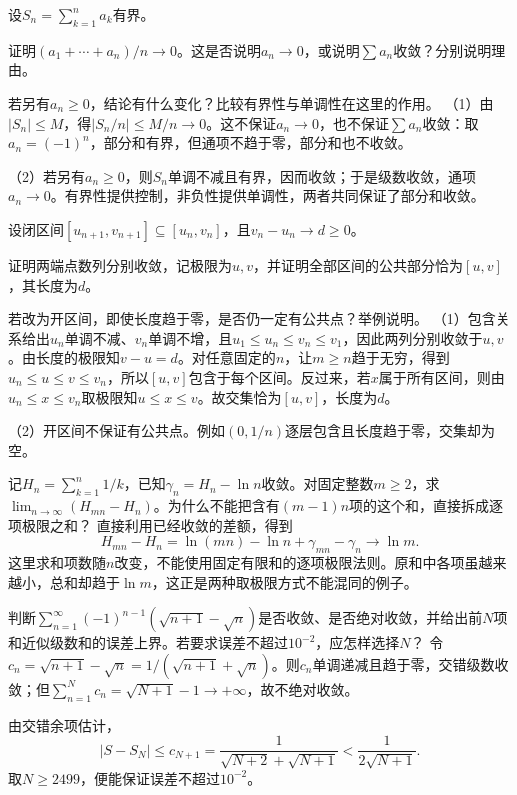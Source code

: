 设\(S_n=\sum_{k=1}^n a_k\)有界。

\quad {}证明\((a_1+\cdots+a_n)/n\to0\)。这是否说明\(a_n\to0\)，或说明\(\sum a_n\)收敛？分别说明理由。

\quad {}若另有\(a_n\ge0\)，结论有什么变化？比较有界性与单调性在这里的作用。
\solutionanswer
（1）由\(|S_n|\le M\)，得\(|S_n/n|\le M/n\to0\)。这不保证\(a_n\to0\)，也不保证\(\sum a_n\)收敛：取\(a_n=(-1)^n\)，部分和有界，但通项不趋于零，部分和也不收敛。

（2）若另有\(a_n\ge0\)，则\(S_n\)单调不减且有界，因而收敛；于是级数收敛，通项\(a_n\to0\)。有界性提供控制，非负性提供单调性，两者共同保证了部分和收敛。


设闭区间\([u_{n+1},v_{n+1}]\subseteq[u_n,v_n]\)，且\(v_n-u_n\to d\ge0\)。

\quad {}证明两端点数列分别收敛，记极限为\(u,v\)，并证明全部区间的公共部分恰为\([u,v]\)，其长度为\(d\)。

\quad {}若改为开区间，即使长度趋于零，是否仍一定有公共点？举例说明。
\solutionanswer
（1）包含关系给出\(u_n\)单调不减、\(v_n\)单调不增，且\(u_1\le u_n\le v_n\le v_1\)，因此两列分别收敛于\(u,v\)。由长度的极限知\(v-u=d\)。对任意固定的\(n\)，让\(m\ge n\)趋于无穷，得到\(u_n\le u\le v\le v_n\)，所以\([u,v]\)包含于每个区间。反过来，若\(x\)属于所有区间，则由\(u_n\le x\le v_n\)取极限知\(u\le x\le v\)。故交集恰为\([u,v]\)，长度为\(d\)。

（2）开区间不保证有公共点。例如\((0,1/n)\)逐层包含且长度趋于零，交集却为空。


记\(H_n=\sum_{k=1}^n1/k\)，已知\(\gamma_n=H_n-\ln n\)收敛。对固定整数\(m\ge2\)，求\(\lim_{n\to\infty}(H_{mn}-H_n)\)。为什么不能把含有\((m-1)n\)项的这个和，直接拆成逐项极限之和？
\solutionanswer
直接利用已经收敛的差额，得到
\[
H_{mn}-H_n=\ln(mn)-\ln n+\gamma_{mn}-\gamma_n\to\ln m.
\]
这里求和项数随\(n\)改变，不能使用固定有限和的逐项极限法则。原和中各项虽越来越小，总和却趋于\(\ln m\)，这正是两种取极限方式不能混同的例子。


判断\(\sum_{n=1}^{\infty}(-1)^{n-1}(\sqrt{n+1}-\sqrt n)\)是否收敛、是否绝对收敛，并给出前\(N\)项和近似级数和的误差上界。若要求误差不超过\(10^{-2}\)，应怎样选择\(N\)？
\solutionanswer
令\(c_n=\sqrt{n+1}-\sqrt n=1/(\sqrt{n+1}+\sqrt n)\)。则\(c_n\)单调递减且趋于零，交错级数收敛；但\(\sum_{n=1}^Nc_n=\sqrt{N+1}-1\to+\infty\)，故不绝对收敛。

由交错余项估计，
\[
|S-S_N|\le c_{N+1}=\frac1{\sqrt{N+2}+\sqrt{N+1}}
<\frac1{2\sqrt{N+1}}.
\]
取\(N\ge2499\)，便能保证误差不超过\(10^{-2}\)。
\par
